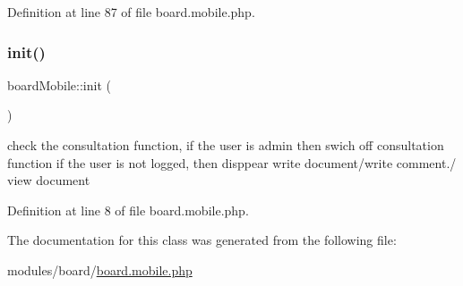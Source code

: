 Definition at line 87 of file board.\+mobile.\+php.

\hypertarget{classboardMobile_ab403b1f5b76033b26e461fc483c2216b}{}\label{classboardMobile_ab403b1f5b76033b26e461fc483c2216b} 
\subsubsection{\texorpdfstring{init()}{init()}}
{\footnotesize\ttfamily board\+Mobile\+::init (\begin{DoxyParamCaption}{ }\end{DoxyParamCaption})}

check the consultation function, if the user is admin then swich off consultation function if the user is not logged, then disppear write document/write comment./ view document

Definition at line 8 of file board.\+mobile.\+php.



The documentation for this class was generated from the following file\+:\begin{DoxyCompactItemize}
\item 
modules/board/\hyperlink{board_8mobile_8php}{board.\+mobile.\+php}\end{DoxyCompactItemize}
